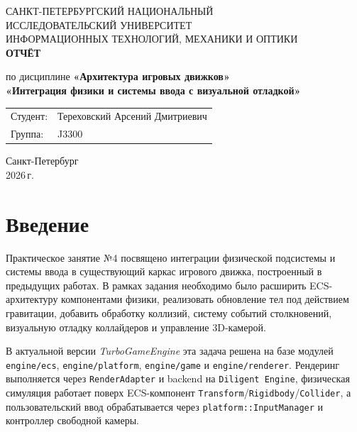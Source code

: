 \documentclass[a4paper,14pt]{extarticle}
\DeclareRobustCommand{\code}[1]{\nolinkurl{#1}}
\begin{document}
\begin{titlepage}
\begin{center}
\large
САНКТ-ПЕТЕРБУРГСКИЙ НАЦИОНАЛЬНЫЙ\\
ИССЛЕДОВАТЕЛЬСКИЙ УНИВЕРСИТЕТ\\
ИНФОРМАЦИОННЫХ ТЕХНОЛОГИЙ, МЕХАНИКИ И ОПТИКИ\\

\vfill
\textbf{ОТЧЁТ}\par
по дисциплине \textbf{«Архитектура игровых движков»}\\[2mm]
\textbf{«Интеграция физики и системы ввода с визуальной отладкой»}\\[10mm]

\vfill
\begin{flushright}
\begin{tabular}{@{}l@{\quad}l@{}}
Студент: & Тереховский Арсений Дмитриевич\\
Группа: & J3300\\
\end{tabular}
\end{flushright}

\vfill
Санкт-Петербург\\
2026\,г.
\end{center}
\end{titlepage}

\newpage
{}
\setcounter{page}{2}
\tableofcontents
\newpage

\section{Введение}
Практическое занятие №4 посвящено интеграции физической подсистемы и системы ввода в существующий каркас игрового движка, построенный в предыдущих работах. В рамках задания необходимо было расширить ECS-архитектуру компонентами физики, реализовать обновление тел под действием гравитации, добавить обработку коллизий, систему событий столкновений, визуальную отладку коллайдеров и управление 3D-камерой.

В актуальной версии \textit{TurboGameEngine} эта задача решена на базе модулей \code{engine/ecs}, \code{engine/platform}, \code{engine/game} и \code{engine/renderer}. Рендеринг выполняется через \texttt{RenderAdapter} и backend на \texttt{Diligent Engine}, физическая симуляция работает поверх ECS-компонент \texttt{Transform}/\texttt{Rigidbody}/\texttt{Collider}, а пользовательский ввод обрабатывается через \texttt{platform::InputManager} и контроллер свободной камеры.
\end{document}
